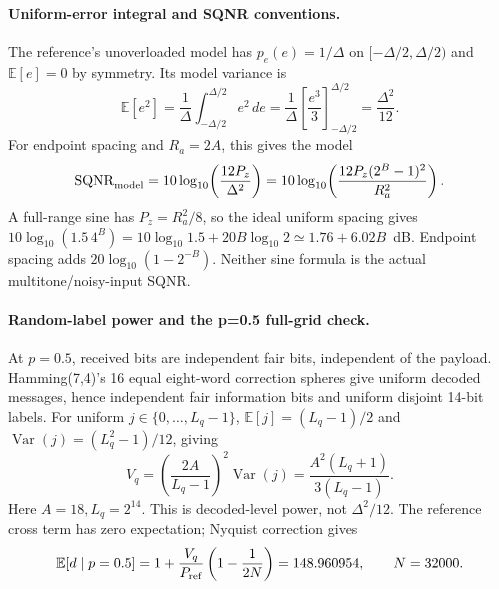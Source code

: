 \paragraph{Uniform-error integral and SQNR conventions.}
The reference's unoverloaded model has $p_e(e)=1/\Delta$ on
$[-\Delta/2,\Delta/2)$ and $\mathbb E[e]=0$ by symmetry. Its model variance is
\citep{bennett1948spectra}
\begin{equation}
 \mathbb E[e^2]=\frac1\Delta\int_{-\Delta/2}^{\Delta/2}e^2\,de
 =\frac1\Delta\left[\frac{e^3}3\right]_{-\Delta/2}^{\Delta/2}
 =\frac{\Delta^2}{12}.
 \label{eq:r31variance}
\end{equation}
For endpoint spacing and $R_a=2A$, this gives the model
\begin{equation}
 {\rm SQNR}_{\rm model}
 =10\log_{10}\!\left(\frac{12P_z}{\Delta^2}\right)
 =10\log_{10}\!\left(\frac{12P_z(2^B-1)^2}{R_a^2}\right).
 \label{eq:r31model}
\end{equation}
A full-range sine has $P_z=R_a^2/8$, so the ideal uniform spacing gives
$10\log_{10}(1.5\,4^B)=10\log_{10}1.5+20B\log_{10}2
\simeq1.76+6.02B$~dB. Endpoint spacing adds $20\log_{10}(1-2^{-B})$.
Neither sine formula is the actual multitone/noisy-input SQNR.

\paragraph{Random-label power and the p=0.5 full-grid check.}
At $p=0.5$, received bits are independent fair bits, independent of the
payload. Hamming(7,4)'s 16 equal eight-word correction spheres give uniform
decoded messages, hence independent fair information bits and uniform
disjoint 14-bit labels. For uniform $j\in\{0,\ldots,L_q-1\}$,
$\mathbb E[j]=(L_q-1)/2$ and $\operatorname{Var}(j)=(L_q^2-1)/12$, giving
\begin{equation}
 V_q=\left(\frac{2A}{L_q-1}\right)^2\operatorname{Var}(j)
 =\frac{A^2(L_q+1)}{3(L_q-1)}.
 \label{eq:r43-uniform-label}
\end{equation}
Here $A=18,L_q=2^{14}$. This is decoded-level power, not $\Delta^2/12$.
The reference cross term has zero expectation; Nyquist correction gives
\begin{equation}
 \mathbb E[d\mid p=0.5]
 =1+\frac{V_q}{P_{\rm ref}}\left(1-\frac1{2N}\right)
 =148.960954,\qquad N=32000.
 \label{eq:r43-half-theory}
\end{equation}

